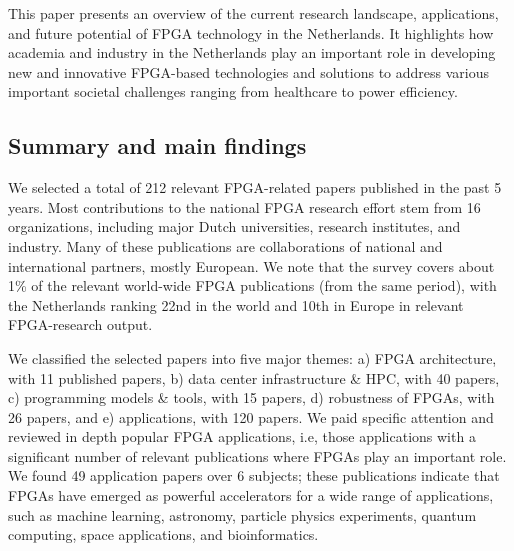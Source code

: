 This paper presents an overview of the current research landscape, applications, and future potential of FPGA technology in the Netherlands. It highlights how academia and industry in the Netherlands play an important role in developing new and innovative FPGA-based technologies and solutions to address various important societal challenges ranging from healthcare to power efficiency. 

\subsection{Summary and main findings}
We selected a total of %
212 relevant FPGA-related papers published in the past 5 years. Most contributions to the national FPGA research effort stem from 16 organizations, including major Dutch universities, research institutes, and %
industry. Many of these publications are collaborations of national and international partners, mostly European. We note that the survey covers about 1\% of the relevant world-wide FPGA publications (from the same period), with the Netherlands ranking 22nd in the world and 10th in Europe in relevant FPGA-research output. 

We classified the selected papers into five major themes: a) FPGA architecture, with 11 published papers, b) data center infrastructure \& HPC, with 40 papers, c) programming models \& tools, with 15 papers, d) robustness of FPGAs, with 26 papers, and e) applications, with 120 papers. We paid specific attention and reviewed in depth popular FPGA applications, i.e, those applications with a significant number of relevant publications where FPGAs play an important role. We found 49 application papers over 6 subjects; these publications indicate that FPGAs have emerged as powerful accelerators for a wide range of applications, such as machine learning, astronomy, particle physics experiments, quantum computing, space applications, and bioinformatics. 

